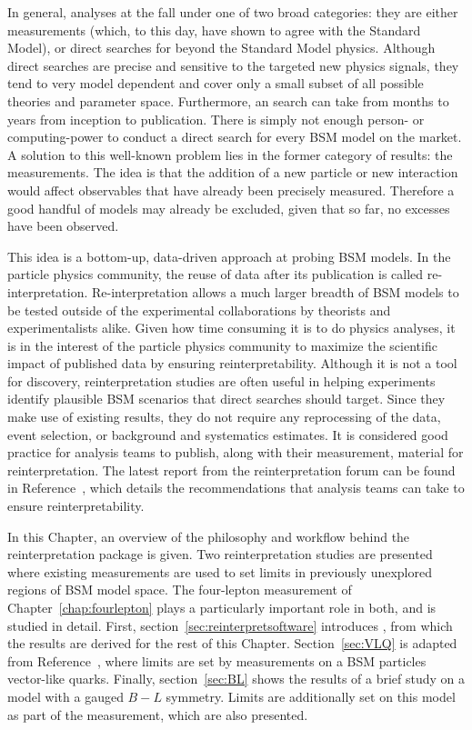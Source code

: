 In general, analyses at the \LHC fall under one of two broad categories: they are either measurements (which, to this day, have shown to agree with the Standard Model), or direct searches for beyond the Standard Model physics. Although direct searches are precise and sensitive to the targeted new physics signals, they tend to very model dependent and cover only a small subset of all possible theories and parameter space. Furthermore, an \LHC search can take from months to years from inception to publication. There is simply not enough person- or computing-power to conduct a direct search for every BSM model on the market. A solution to this well-known problem lies in the former category of \LHC results: the measurements. The idea is that the addition of a new particle or new interaction would affect observables that have already been precisely measured. Therefore a good handful of models may already be excluded, given that so far, no excesses have been observed. 

This idea is a bottom-up, data-driven approach at probing BSM models. In the particle physics community, the reuse of data after its publication is called re-interpretation. Re-interpretation allows a much larger breadth of BSM models to be tested outside of the experimental collaborations by theorists and experimentalists alike. Given how time consuming it is to do physics analyses, it is in the interest of the particle physics community to maximize the scientific impact of published data by ensuring reinterpretability. Although it is not a tool for discovery, reinterpretation studies are often useful in helping experiments identify plausible BSM scenarios that direct searches should target. Since they make use of existing results, they do not require any reprocessing of the data, event selection, or background and systematics estimates. It is considered good practice for analysis teams to publish, along with their measurement, material for reinterpretation. The latest report from the \LHC reinterpretation forum can be found in Reference~\cite{Abdallah:2020pec}, which details the recommendations that analysis teams can take to ensure reinterpretability.

In this Chapter, an overview of the philosophy and workflow behind the \contur reinterpretation package is given. Two reinterpretation studies are presented where existing \LHC measurements are used to set limits in previously unexplored regions of BSM model space. The \ATLAS four-lepton measurement of Chapter~\ref{chap:fourlepton} plays a particularly important role in both, and is studied in detail. First, section~\ref{sec:reinterpretsoftware} introduces \contur, from which the results are derived for the rest of this Chapter. Section~\ref{sec:VLQ} is adapted from Reference~\cite{VLQ_contur}, where limits are set by \LHC measurements on a BSM particles vector-like quarks. Finally, section~\ref{sec:BL} shows the results of a brief study on a model with a gauged $B-L$ symmetry. Limits are additionally set on this model as part of the \ATLAS \mFourL{} measurement, which are also presented.


